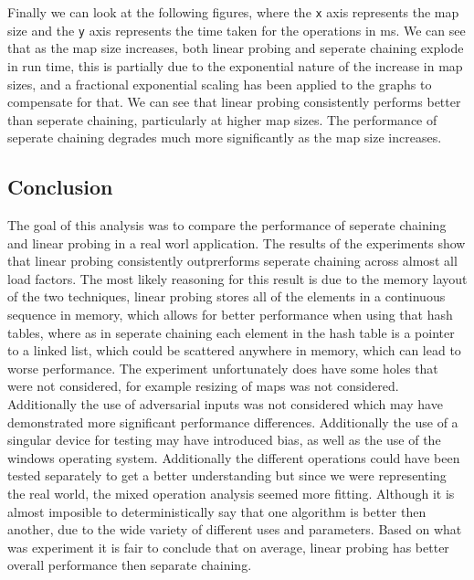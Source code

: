\documentclass{article}
\begin{document}
Finally we can look at the following figures, where the \texttt{x} axis represents the map size and the \texttt{y} axis represents the time taken for the operations in ms. We can see that as the map size increases, both linear probing and seperate chaining explode in run time, this is partially due to the exponential nature of the increase in map sizes, and a fractional exponential scaling has been applied to the graphs to compensate for that. We can see that linear probing consistently performs better than seperate chaining, particularly at higher map sizes. The performance of seperate chaining degrades much more significantly as the map size increases.

\newpage
\subsection*{Conclusion}
The goal of this analysis was to compare the performance of seperate chaining and linear probing in a real worl application. The results of the experiments show that linear probing consistently outprerforms seperate chaining across almost all load factors. The most likely reasoning for this result is due to the memory layout of the two techniques, linear probing stores all of the elements in a continuous sequence in memory, which allows for better performance when using that hash tables, where as in seperate chaining each element in the hash table is a pointer to a linked list, which could be scattered anywhere in memory, which can lead to worse performance. The experiment unfortunately does have some holes that were not considered, for example resizing of maps was not considered. Additionally the use of adversarial inputs was not considered which may have demonstrated more significant performance differences. Additionally the use of a singular device for testing may have introduced bias, as well as the use of the windows operating system. Additionally the different operations could have been tested separately to get a better understanding but since we were representing the real world, the mixed operation analysis seemed more fitting. Although it is almost imposible to deterministically say that one algorithm is better then another, due to the wide variety of different uses and parameters. Based on what was experiment it is fair to conclude that on average, linear probing has better overall performance then separate chaining.
\end{document}
